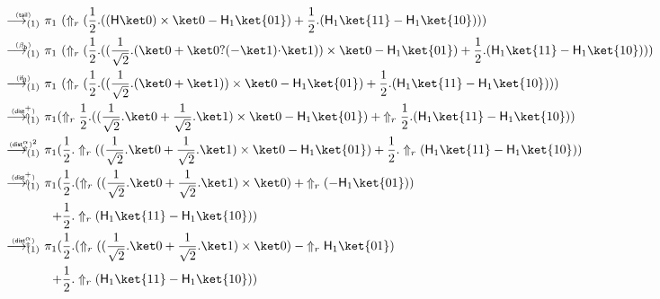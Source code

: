 \documentclass[preprint]{elsarticle}
\newcommand\lra[1][1]{\longrightarrow_{\left(#1\right)}}
\newcommand\ite[3]{{#1}?{#2}\mathord{\cdot}{#3}}
\newcommand\pair[2]{({#1}+{#2})}
\newcommand\npair[2]{({#1}-{#2})}
\newcommand\s[1]{\ensuremath{\mathsf{#1}}}
\newcommand\red[2][1]{\overset{\scriptscriptstyle\smash{#2}\vphantom{x}}{\lra[#1]}\ }
\newcommand\rbetab{(\s{\beta_b})}
\newcommand\riffalse{(\s{if_{0}})}
\newcommand\rdistcasum{(\s{dist^+_\Uparrow})}
\newcommand\rdistcascal{(\s{dist^\alpha_\Uparrow})}
\newcommand\rtail{(\s{tail})}
\begin{document}
\begin{align*}
  \red\rtail&
              \pi_1\ (\Uparrow_r
              \pair
              { \frac 12.  \npair{ (\s H\ket 0)\times\ket 0 }{\s H_1\ket{01}} }
              { \frac 12.  \npair{\s H_1\ket{11}}{\s H_1\ket{10}} }) \\
  \red\rbetab&
               \pi_1\ (\Uparrow_r
               \pair
               { \frac 12.  \npair{ ( \frac 1{\sqrt 2}.  \pair{\ket 0}{\ite{\ket 0}{(-\ket 1)}{\ket 1}}) \times\ket 0 }{\s H_1\ket{01}} }
               { \frac 12.  \npair{\s H_1\ket{11}}{\s H_1\ket{10}} }) \\
  \red\riffalse&
                 \pi_1\ (\Uparrow_r
                 \pair
                 { \frac 12.  \npair{ ( \frac 1{\sqrt 2}.  \pair{\ket 0}{\ket 1}) \times\ket 0 }{\s H_1\ket{01}} }
                 { \frac 12.  \npair{\s H_1\ket{11}}{\s H_1\ket{10}} }) \\
  \red\rdistcasum&
                   \pi_1
                   \pair
                   { \Uparrow_r \frac 12.  \npair{ ( \frac 1{\sqrt 2}.\ket 0+\frac 1{\sqrt 2}.\ket 1) \times\ket 0 }{\s H_1\ket{01}} }
                   { \Uparrow_r \frac 12.  \npair{\s H_1\ket{11}}{\s H_1\ket{10}} } \\
  \red{\rdistcascal^2}&
                        \pi_1
                        \pair
                        { \frac 12.  \Uparrow_r \npair{ ( \frac 1{\sqrt 2}.\ket 0+\frac 1{\sqrt 2}.\ket 1) \times\ket 0 }{\s H_1\ket{01}} }
                        { \frac 12.  \Uparrow_r \npair{\s H_1\ket{11}}{\s H_1\ket{10}} } \\
  \red\rdistcasum&
                   \begin{aligned}[t]
                     \pi_1 ( & { \frac 12.  \pair{ \Uparrow_r ( ( \frac 1{\sqrt 2}.\ket 0+\frac 1{\sqrt 2}.\ket 1) \times\ket 0) }{ \Uparrow_r (-\s H_1\ket{01}) } }\\
                     +& { \frac 12. \Uparrow_r \npair{\s
                         H_1\ket{11}}{\s H_1\ket{10}} })
                   \end{aligned}
  \\
  \red\rdistcascal&
                    \begin{aligned}[t]
                      \pi_1 ( & { \frac 12.  \npair{ \Uparrow_r ( \pair{\frac 1{\sqrt 2}.\ket 0}{\frac 1{\sqrt 2}.\ket 1} \times\ket 0) }{ \Uparrow_r \s H_1\ket{01} } }\\
                      +& { \frac 12. \Uparrow_r \npair{\s
                          H_1\ket{11}}{\s H_1\ket{10}} })
                    \end{aligned}

\end{align*}
\end{document}

